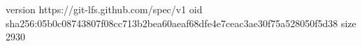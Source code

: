 version https://git-lfs.github.com/spec/v1
oid sha256:05b0c08743807f08cc713b2bea60aeaf68dfe4e7ceac3ae30f75a528050f5d38
size 2930
